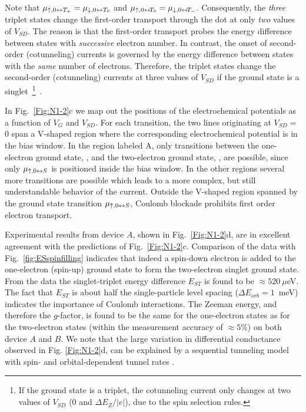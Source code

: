 \documentclass[rmp,twocolumn,aps]{revtex4}
\begin{document}
Note that $\mu_{\uparrow,0 \leftrightarrow T_+} = \mu_{\downarrow,0
\leftrightarrow T_0}$ and $\mu_{\uparrow,0 \leftrightarrow \!T_0} =
\mu_{\downarrow,0 \leftrightarrow \!T_-}$. Consequently, the
\textit{three} triplet states change the first-order transport
through the dot at only \textit{two} values of $V_{SD}$. The
reason is that the first-order transport probes the energy
difference between states with \textit{successive} electron
number. In contrast, the onset of second-order (cotunneling)
currents is governed by the energy difference between states with
the \textit{same} number of electrons. Therefore, the triplet
states change the second-order (cotunneling) currents at three
values of $V_{SD}$ if the ground state is a singlet~\footnote{If
the ground state is a triplet, the cotunneling current only
changes at two values of $V_{SD}$ (0 and $\Delta E_Z/|e|$), due to
the spin selection rules.}~\cite{PaaskeNatPhys2006}.

In Fig.~\ref{Fig:N1-2}c we map out the positions of the
electrochemical potentials as a function of $V_G$ and $V_{SD}$.
For each transition, the two lines originating at $V_{SD}\!=\!$ 0
span a V-shaped region where the corresponding electrochemical
potential is in the bias window. In the region labeled A, only
transitions between the one-electron ground state, ,
and the two-electron ground state, , are possible, since
only $\mu_{\uparrow,0 \leftrightarrow S}$ is positioned inside the bias
window. In the other regions several more transitions are possible
which leads to a more complex, but still understandable behavior
of the current. Outside the V-shaped region spanned by the ground
state transition $\mu_{\uparrow,0\leftrightarrow S}$, Coulomb blockade
prohibits first order electron transport.

Experimental results from device $A$, shown in
Fig.~\ref{Fig:N1-2}d, are in excellent agreement with the
predictions of Fig.~\ref{Fig:N1-2}c. Comparison of the data with
Fig.~\ref{fig:ESspinfilling} indicates that indeed a spin-down
electron is added to the one-electron (spin-up) ground state to
form the two-electron singlet ground state. From the data the
singlet-triplet energy difference $E_{ST}$ is found to be
$\approx 520~\mu$eV. The fact that $E_{ST}$ is about half the
single-particle level spacing ($\Delta E_{orb}=1$~meV) indicates
the importance of Coulomb interactions. The Zeeman energy, and
therefore the $g$-factor, is found to be the same for the
one-electron states as for the two-electron states (within the
measurement accuracy of $\approx\!5\%$) on both device $A$ and
$B$. We note that the large variation in differential conductance
observed in Fig. \ref{Fig:N1-2}d, can be explained by a sequential
tunneling model with spin- and orbital-dependent tunnel rates
\cite{RonaldMoriond}.
\end{document}
